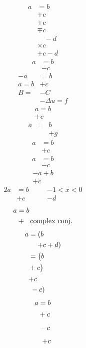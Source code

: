 \documentclass{article}
\begin{document}
\begin{align} a &= b \\ &+ c \\ &\pm c \\ &\mp c \\ &\quad - d \\ &\times c \\ &+ c - d \end{align}
\begin{align*} a &= b \\ &- c \end{align*}
\begin{align} -a &= b \\ a = b &+ c \\ B =& - C \\ &-\Delta u = f \end{align}
\begin{gather} a = b \\ + c \end{gather}
\begin{eqnarray} a &=& b \\ && +g \end{eqnarray}
\[\begin{aligned} a&=b\\ &+c\end{aligned}\]
\begin{equation}\begin{split} a&=b\\ &- c\end{split}\end{equation}
\begin{multline} -a + b \\ + c \end{multline}
\begin{alignat}{2} a &= b &\quad& -1<x<0 \\ &+ c && -d \end{alignat}
\begin{align} a &= b \\ & + \ \ {\rm complex\  conj.} \end{align}
\begin{align} a &= \left( b \right. \\ &\quad\left. + c + d \right) \\ &= \big( b \\ &+ c \big) \\ &\bigl. + c \\ &\left. \vphantom{X} - c \right) \end{align}
\begin{align} a &= b \\ &\big. + c \\ &\Big. - c \\ &\bigm. + c \end{align}
\end{document}
